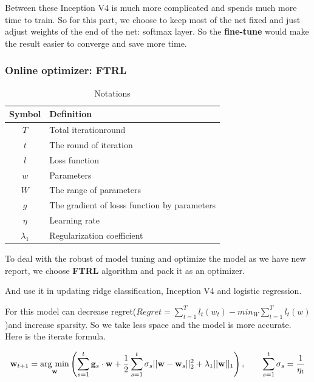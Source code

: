 \documentclass[12pt]{article}
\begin{document}
Between these Inception V4 is much more complicated and spends much more time to train.  So for this part, we choose to keep most of the net fixed and just adjust weights of the end of the net: softmax layer. So the \textbf{fine-tune} would make the result easier to converge and save more time.

\subsubsection{Online optimizer: FTRL}
\begin{table}[H]
	\begin{center}
		\caption{Notations}
		\begin{tabular}{cl}
			\toprule
			\multicolumn{1}{m{3cm}}{\centering Symbol}
			&\multicolumn{1}{m{8cm}}{\centering Definition}\\
			\midrule
			$T$& Total iterationround\\
			$t$& The round of iteration \\
			$l$&Loss function\\
			$w$&Parameters\\
			$W$&The range of parameters\\
			$g$& The gradient of losss function by parameters\\
			$\eta$&Learning rate\\
			$\lambda_1$&Regularization coefficient\\
			\bottomrule
		\end{tabular}\label{Ntt}
	\end{center}
\end{table}
To deal with the robust of model tuning and optimize the model as we have new report, we choose \textbf{FTRL}  algorithm and pack it as an optimizer.

And use it in updating ridge classification, Inception V4 and logistic regression.

For this model can decrease regret($Regret=\sum_{t=1}^T l_t(w_t)-min_{W}\sum_{t=1}^Tl_t(w)$)and increase sparsity. So  we take less space and the model is more accurate. Here is the iterate formula.



\begin{equation}\mathbf{w}_{t+1} = \underset{\rm \mathbf{w}}{\rm arg\ min}\left(\displaystyle\sum_{s=1}^t {\mathbf{g}_s \cdot \mathbf{w}} + \frac 12 \displaystyle\sum_{s=1}^t {\sigma_s||\mathbf{w} - \mathbf{w}_s||_2^2} + \lambda_1||\mathbf{w}||_1\right),\qquad \sum_{s=1}^t \sigma_s = \frac 1{\eta_t}\end{equation}
\end{document}
